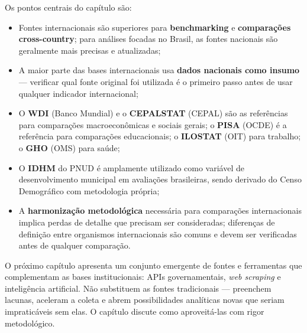 Os pontos centrais do capítulo são:

\begin{itemize}
  \item Fontes internacionais são superiores para \textbf{benchmarking} e \textbf{comparações cross-country}; para análises focadas no Brasil, as fontes nacionais são geralmente mais precisas e atualizadas;
  \item A maior parte das bases internacionais usa \textbf{dados nacionais como insumo} --- verificar qual fonte original foi utilizada é o primeiro passo antes de usar qualquer indicador internacional;
  \item O \textbf{WDI} (Banco Mundial) e o \textbf{CEPALSTAT} (CEPAL) são as referências para comparações macroeconômicas e sociais gerais; o \textbf{PISA} (OCDE) é a referência para comparações educacionais; o \textbf{ILOSTAT} (OIT) para trabalho; o \textbf{GHO} (OMS) para saúde;
  \item O \textbf{IDHM} do PNUD é amplamente utilizado como variável de desenvolvimento municipal em avaliações brasileiras, sendo derivado do Censo Demográfico com metodologia própria;
  \item A \textbf{harmonização metodológica} necessária para comparações internacionais implica perdas de detalhe que precisam ser consideradas; diferenças de definição entre organismos internacionais são comuns e devem ser verificadas antes de qualquer comparação.
\end{itemize}

\medskip

O próximo capítulo apresenta um conjunto emergente de fontes e ferramentas que complementam as bases institucionais: APIs governamentais, \textit{web scraping} e inteligência artificial. Não substituem as fontes tradicionais --- preenchem lacunas, aceleram a coleta e abrem possibilidades analíticas novas que seriam impraticáveis sem elas. O capítulo discute como aproveitá-las com rigor metodológico.